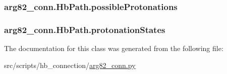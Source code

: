 \hypertarget{classarg82__conn_1_1_hb_path_a05571020ca98f5dcc62546f6cc7b3cfa}{
\subsubsection[{possible\-Protonations}]{\setlength{\rightskip}{0pt plus 5cm}arg82\-\_\-conn.\-Hb\-Path.\-possible\-Protonations}}\label{classarg82__conn_1_1_hb_path_a05571020ca98f5dcc62546f6cc7b3cfa}
\hypertarget{classarg82__conn_1_1_hb_path_a703ccb2cd6fb30f1fdec066071abe05c}{
\subsubsection[{protonation\-States}]{\setlength{\rightskip}{0pt plus 5cm}arg82\-\_\-conn.\-Hb\-Path.\-protonation\-States}}\label{classarg82__conn_1_1_hb_path_a703ccb2cd6fb30f1fdec066071abe05c}


The documentation for this class was generated from the following file\-:\begin{DoxyCompactItemize}
\item 
src/scripts/hb\-\_\-connection/\hyperlink{arg82__conn_8py}{arg82\-\_\-conn.\-py}\end{DoxyCompactItemize}
